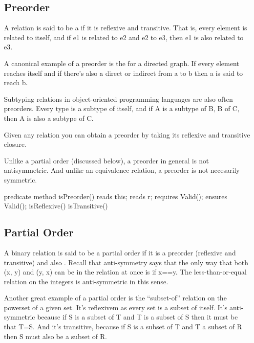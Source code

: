 \documentclass[letterpaper,10pt,english]{sphinxmanual}
\begin{document}
\subsection{Preorder}
\label{\detokenize{08-relations:preorder}}
A relation is said to be a  if it is reflexive and
transitive. That is, every element is related to itself, and if e1 is
related to e2 and e2 to e3, then e1 is also related to e3.

A canonical example of a preorder is the  for a
directed graph. If every element reaches itself and if there’s also a
direct or indirect  from a to b then a is said to reach b.

Subtyping relations in object-oriented programming languages are also
often preorders.  Every type is a subtype of itself, and if A is a
subtype of B, B of C, then A is also a subtype of C.

Given any relation you can obtain a preorder by taking its reflexive
and transitive closure.

Unlike a partial order (discussed below), a preorder in general
is not antisymmetric. And unlike an equivalence
relation, a preorder is not necesarily symmetric.

\begin{sphinxVerbatim}[commandchars=\\\{\}]
predicate method isPreorder()
    reads this;
    reads r;
    requires Valid();
    ensures Valid();
\PYGZob{}
    isReflexive() \PYGZam{}\PYGZam{} isTransitive()
\PYGZcb{}
\end{sphinxVerbatim}


\subsection{Partial Order}
\label{\detokenize{08-relations:partial-order}}
A binary relation is said to be a partial order if it is a preorder
(reflexive and transitive) and also . Recall that
anti-symmetry says that the only way that both (x, y) and (y, x) can
be in the relation at once is if x==y. The less-than-or-equal relation
on the integers is anti-symmetric in this sense.

Another great example of a partial order is the “subset-of” relation
on the powerset of a given set. It’s reflexivem as every set is a
subset of itself. It’s anti-symmetric because if S is a subset of T
and T is a subset of S then it must be that T=S.  And it’s transitive,
because if S is a subset of T and T a subset of R then S must also be
a subset of R.
\end{document}
